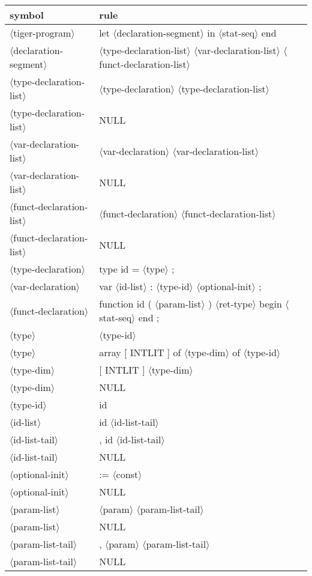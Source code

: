 \documentclass[11pt, fleqn]{article}
\newcommand{\atag}[1]{$\langle$#1$\rangle$}
\begin{document}
\begin{longtable}{l|l}
symbol							&	rule								\\
\hline
\atag{tiger-program}				&	let \atag{declaration-segment} in \atag{stat-seq} end				\\
\atag{declaration-segment}		&	\atag{type-declaration-list}	\atag{var-declaration-list} \atag{funct-declaration-list}	\\
\atag{type-declaration-list}		&	\atag{type-declaration} \atag{type-declaration-list}	\\
\atag{type-declaration-list}		&	NULL		\\
\atag{var-declaration-list}		&	\atag{var-declaration} \atag{var-declaration-list}	\\
\atag{var-declaration-list}		&	NULL		\\
\atag{funct-declaration-list}	&	\atag{funct-declaration} \atag{funct-declaration-list}	\\
\atag{funct-declaration-list}	&	NULL		\\
\atag{type-declaration}			&	type id = \atag{type} ;		\\
\atag{var-declaration}			&	var \atag{id-list} : \atag{type-id} \atag{optional-init} ;		\\
\atag{funct-declaration}			&	function id ( \atag{param-list} ) \atag{ret-type} begin \atag{stat-seq} end ;	\\
\atag{type}						&	\atag{type-id}		\\
\atag{type}						&	array [ INTLIT ] of \atag{type-dim} of \atag{type-id}	\\
\atag{type-dim}					&	[ INTLIT ] \atag{type-dim}	\\
\atag{type-dim}					&	NULL		\\
\atag{type-id}					&	id		\\
\atag{id-list}					&	id \atag{id-list-tail}		\\
\atag{id-list-tail}				&	, id \atag{id-list-tail}		\\
\atag{id-list-tail}				&	NULL		\\
\atag{optional-init}				&	:= \atag{const}		\\
\atag{optional-init}				&	NULL		\\
\atag{param-list}				&	\atag{param}	 \atag{param-list-tail}	\\
\atag{param-list}				&	NULL		\\
\atag{param-list-tail}			&	, \atag{param} \atag{param-list-tail}		\\
\atag{param-list-tail}			&	NULL		\\

\end{longtable}
\end{document}
